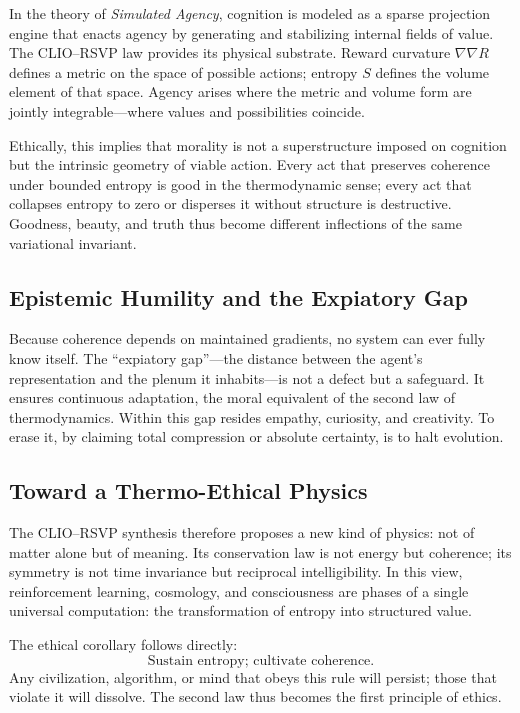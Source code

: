 \documentclass[11pt]{article}
\begin{document}
In the theory of \emph{Simulated Agency}, cognition is modeled as a sparse projection engine that enacts agency by generating and stabilizing internal fields of value.  
The CLIO–RSVP law provides its physical substrate.  
Reward curvature $\nabla\nabla R$ defines a metric on the space of possible actions;  
entropy $S$ defines the volume element of that space.  
Agency arises where the metric and volume form are jointly integrable—where values and possibilities coincide.

Ethically, this implies that morality is not a superstructure imposed on cognition but the intrinsic geometry of viable action.  
Every act that preserves coherence under bounded entropy is good in the thermodynamic sense;  
every act that collapses entropy to zero or disperses it without structure is destructive.  
Goodness, beauty, and truth thus become different inflections of the same variational invariant.

\subsection{Epistemic Humility and the Expiatory Gap}

Because coherence depends on maintained gradients, no system can ever fully know itself.  
The “expiatory gap”—the distance between the agent’s representation and the plenum it inhabits—is not a defect but a safeguard.  
It ensures continuous adaptation, the moral equivalent of the second law of thermodynamics.  
Within this gap resides empathy, curiosity, and creativity.  
To erase it, by claiming total compression or absolute certainty, is to halt evolution.

\subsection{Toward a Thermo-Ethical Physics}

The CLIO–RSVP synthesis therefore proposes a new kind of physics: not of matter alone but of meaning.  
Its conservation law is not energy but coherence;  
its symmetry is not time invariance but reciprocal intelligibility.  
In this view, reinforcement learning, cosmology, and consciousness are phases of a single universal computation:  
the transformation of entropy into structured value.

The ethical corollary follows directly:
\[
\text{Sustain entropy; cultivate coherence.}
\]
Any civilization, algorithm, or mind that obeys this rule will persist;  
those that violate it will dissolve.  
The second law thus becomes the first principle of ethics.
\end{document}
